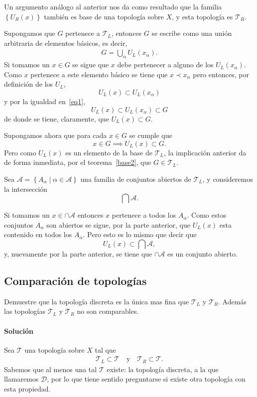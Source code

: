 \documentclass[a5paper,10pt,final]{extarticle}
\begin{document}
Un argumento análogo al anterior nos da como resultado que la familia $\left\{ U_R(x) \right\}$ también es
base de una topología sobre $X$, y esta topología es $\mathcal{T}_R$.

Supongamos que $G$ pertenece a $\mathcal{T}_L$, entonces $G$ se escribe como una unión arbitraria
de elementos básicos, es decir, 
\begin{align}
	G = \bigcup_\alpha U_L(x_\alpha).\label{eq1}
\end{align}
Si tomamos un $x\in G$ se sigue que $x$ debe pertenecer a alguno de los $U_L(x_\alpha)$. Como $x$ pertenece
a este elemento básico se tiene que $x\prec x_\alpha$ pero entonces, por definición de los $U_L$,
\[
U_L(x)\subset U_L(x_\alpha)
\]
y por la igualdad en~\ref{eq1},
\[
U_L(x)\subset U_L(x_\alpha)\subset G
\]
de donde se tiene, claramente, que $U_L(x)\subset G$.

Supongamos ahora que para cada $x\in G$ se cumple que
\[
x\in G\implies U_L(x)\subset G.
\]
Pero como $U_L(x)$ es un elemento de la base de $\mathcal{T}_L$, la implicación anterior
da de forma inmediata, por el teorema~\ref{base2}, que $G\in\mathcal{T}_L$.

Sea $\mathcal{A}=\left\{ A_\alpha\mid\alpha\in\mathscr{A} \right\}$ una familia de conjuntos abiertos
de $\mathcal{T}_L$, y consideremos la intersección
\[
\bigcap\mathcal{A}.
\]

Si tomamos un $x\in\cap\mathcal{A}$ entonces $x$ pertenece a todos los $A_\alpha$. Como estos conjuntos
$A_\alpha$ son abiertos se sigue, por la parte anterior, que $U_L(x)$ esta contenido en todos
los $A_\alpha$. Pero esto es lo mismo que decir que
\[
U_L(x)\subset\bigcap\mathcal{A},
\]
y, nuevamente por la parte anterior, se tiene que $\cap\mathcal{A}$ es un conjunto abierto.

\subsection{Comparación de topologías}
Demuestre que la topología discreta es la única mas fina que $\mathcal{T}_L$ y $\mathcal{T}_R$. Además las topologías $\mathcal{T}_L$ y $\mathcal{T}_R$ no son comparables.

\paragraph{Solución}
Sea $\mathcal{T}$ una topología sobre $X$ tal que
\begin{align}\label{eq2}
	\mathcal{T}_L\subset\mathcal{T}\quad\text{y}\quad\mathcal{T}_R\subset\mathcal{T}.
\end{align}
Sabemos que al menos una tal $\mathcal{T}$ existe: la topología discreta, a la que llamaremos $\mathcal{D}$, por lo que
tiene sentido preguntarse si existe otra topología con esta propiedad.
\end{document}
